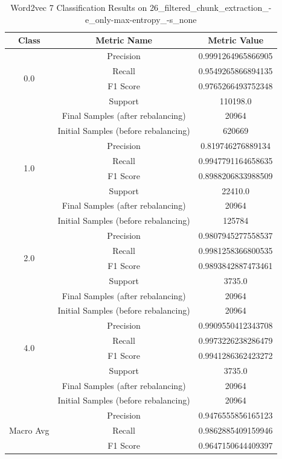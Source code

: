 \begin{longtable}{|c|c|c|}
\caption{Word2vec 7 Classification Results on 26\_filtered\_chunk\_extraction\_-e\_only-max-entropy\_-s\_none} \label{tab:26_filtered_chunk_extraction_-e_only-max-entropy_-s_none_word2vec_7_classifiers_results} \\
\hline
Class & Metric Name & Metric Value \\
\hline
\multirow{4}{*}{0.0} & Precision & 0.9991264965866905 \\
 & Recall & 0.9549265866894135 \\
 & F1 Score & 0.9765266493752348 \\
 & Support & 110198.0 \\
 & Final Samples (after rebalancing) & 20964 \\
 & Initial Samples (before rebalancing) & 620669 \\
\hline
\multirow{4}{*}{1.0} & Precision & 0.819746276889134 \\
 & Recall & 0.9947791164658635 \\
 & F1 Score & 0.8988206833988509 \\
 & Support & 22410.0 \\
 & Final Samples (after rebalancing) & 20964 \\
 & Initial Samples (before rebalancing) & 125784 \\
\hline
\multirow{4}{*}{2.0} & Precision & 0.9807945277558537 \\
 & Recall & 0.9981258366800535 \\
 & F1 Score & 0.9893842887473461 \\
 & Support & 3735.0 \\
 & Final Samples (after rebalancing) & 20964 \\
 & Initial Samples (before rebalancing) & 20964 \\
\hline
\multirow{4}{*}{4.0} & Precision & 0.9909550412343708 \\
 & Recall & 0.9973226238286479 \\
 & F1 Score & 0.9941286362423272 \\
 & Support & 3735.0 \\
 & Final Samples (after rebalancing) & 20964 \\
 & Initial Samples (before rebalancing) & 20964 \\
\hline
\multirow{4}{*}{Macro Avg} & Precision & 0.9476555856165123 \\
 & Recall & 0.9862885409159946 \\
 & F1 Score & 0.9647150644409397 \\

\end{longtable}
